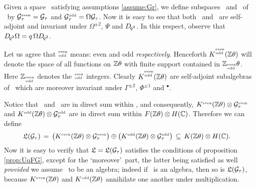Given a space \Gtau\ satisfying assumptions \ref{assume:Gr},
we define subspaces \Geven\ and \Godd\ of \HC\ by
$\Geven = \Gtau$ and $\Godd = \Omega\Gtau$.
Now it is easy to see that both \Geven\ and \Godd\ are self-adjoint and invariant
under $\Omega^{\pm 2}$, $\Psi$ and $\Dqsqr$.
In this respect, observe that $\Dqsqr \Omega = q\,\Omega \Dqsqr$.
\vspace{1ex}

Let us agree that $\evenodd$ means: even and odd {\em respectively}\@.
Henceforth $K^\evenodd(\Zt)$ will denote the space of all
functions on $\Zt$ with finite support contained in $\ZZ_\evenodd\theta$.
Here $\ZZ_\evenodd$ denotes the $\evenodd$ integers.
Clearly $K^\evenodd (\Zt)$ are self-adjoint subalgebras of \FZ\ which are
moreover invariant under $\Gamma^{\pm 2}$, $\Phi^{\pm 1}$ and $^\bullet$.
\vspace{2ex}

Notice that \KZeven\ and \KZodd\ are in direct sum within \FZ,
and consequently, $\KZeven \tens \Geven$ and $\KZodd \tens \Godd$
are in direct sum within $\FZ \tens \HC$. Therefore we can define
\begin{equation}\label{eq:def:TG}
  \calL(\Gtau) \,=\,  \left(\KZeven \tens \Geven \vertM\right) \oplus
                      \left(\KZodd  \tens \Godd  \vertM\right)
  \, \subseteq \,  \KZ \tens \HC. \;
\end{equation}
Now it is easy to verify that $\calL=\calL(\Gtau)$ satisfies the conditions of
proposition \ref{prop:UqFG}, except for the \lq moreover\rq\ part,
the latter being satisfied as well {\em provided\/} we assume \Gtau\ to be an
algebra; indeed if \Gtau\ is an algebra, then so is $\calL(\Gtau)$,
because $\KZeven$ and $\KZodd$ annihilate one another under multiplication.


